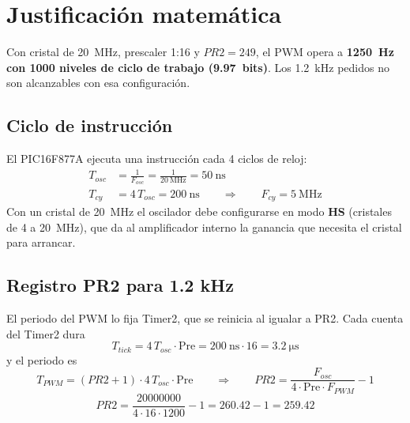 \section{Justificación matemática}
\label{sec:calculos}

Con cristal de \SI{20}{\mega\hertz}, prescaler 1:16 y $PR2 = 249$, el PWM
opera a \textbf{\SI{1250}{\hertz} con 1000 niveles de ciclo de trabajo
(\num{9.97}~bits)}. Los \SI{1.2}{\kilo\hertz} pedidos no son alcanzables con
esa configuración.

\subsection{Ciclo de instrucción}

El PIC16F877A ejecuta una instrucción cada 4 ciclos de reloj:
\begin{align}
  T_{osc} &= \frac{1}{F_{osc}} = \frac{1}{\SI{20}{\mega\hertz}} = \SI{50}{\nano\second} \\
  T_{cy}  &= 4\,T_{osc} = \SI{200}{\nano\second}
  \qquad\Rightarrow\qquad F_{cy} = \SI{5}{\mega\hertz}
\end{align}
Con un cristal de \SI{20}{\mega\hertz} el oscilador debe configurarse en modo
\textbf{HS} (cristales de 4 a \SI{20}{\mega\hertz}), que da al amplificador
interno la ganancia que necesita el cristal para arrancar.

\subsection{Registro PR2 para 1.2 kHz}

El periodo del PWM lo fija Timer2, que se reinicia al igualar a PR2. Cada
cuenta del Timer2 dura
\begin{equation}
  T_{tick} = 4\,T_{osc}\cdot\text{Pre} = \SI{200}{\nano\second}\cdot 16 = \SI{3.2}{\micro\second}
\end{equation}
y el periodo es
\begin{equation}
  T_{PWM} = (PR2 + 1)\cdot 4\,T_{osc}\cdot \text{Pre}
  \qquad\Rightarrow\qquad
  PR2 = \frac{F_{osc}}{4\cdot \text{Pre}\cdot F_{PWM}} - 1
  \label{eq:pr2}
\end{equation}
\begin{equation}
  PR2 = \frac{\num{20000000}}{4\cdot 16\cdot 1200} - 1 = 260.42 - 1 = 259.42
\end{equation}

